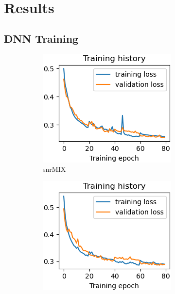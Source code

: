 \documentclass[conference]{IEEEtran}
\begin{document}
\smallskip
\section{Results}
\subsection{DNN Training}
\label{sec:dnn_training}

\begin{figure}[h]
    \centering
    \begin{subfigure}[b]{0.157\textwidth}
        \centering
        \includegraphics[width=\textwidth]{images/train_hist_snrMIX.png}
        \caption{snrMIX}
        \label{fig:train_hist_snrMIX}
    \end{subfigure}
    \begin{subfigure}[b]{0.157\textwidth}
        \centering
        \includegraphics[width=\textwidth]{images/train_hist_snrMIX2.png}

\end{subfigure}
\end{figure}
\end{document}
